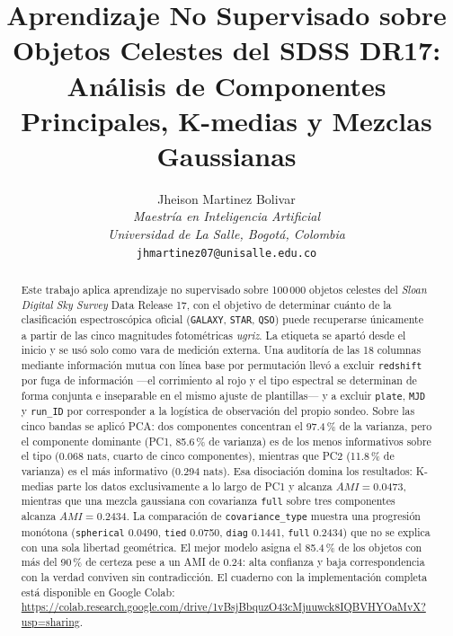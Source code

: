 \documentclass[10pt,journal]{IEEEtran}
\newcommand{\enlacenb}{https://colab.research.google.com/drive/1vBsjBbquzO43cMjuuwck8IQBVHYOaMvX?usp=sharing}
\begin{document}
  \title{Aprendizaje No Supervisado sobre Objetos Celestes del {SDSS} {DR17}:\\
    An\'alisis de Componentes Principales, K-medias y Mezclas Gaussianas}

  \author{
    Jheison Martinez Bolivar\\
    \textit{Maestr\'ia en Inteligencia Artificial}\\
    \textit{Universidad de La Salle, Bogot\'a, Colombia}\\
    \texttt{jhmartinez07@unisalle.edu.co}
  }
  \maketitle

  \begin{abstract}
    Este trabajo aplica aprendizaje no supervisado sobre 100\,000 objetos celestes del \emph{Sloan Digital Sky Survey} Data Release 17, con el objetivo de determinar cu\'anto de la clasificaci\'on espectrosc\'opica oficial (\texttt{GALAXY}, \texttt{STAR}, \texttt{QSO}) puede recuperarse \'unicamente a partir de las cinco magnitudes fotom\'etricas \emph{ugriz}. La etiqueta se apart\'o desde el inicio y se us\'o solo como vara de medici\'on externa. Una auditor\'ia de las 18 columnas mediante informaci\'on mutua con l\'inea base por permutaci\'on llev\'o a excluir \texttt{redshift} por fuga de informaci\'on ---el corrimiento al rojo y el tipo espectral se determinan de forma conjunta e inseparable en el mismo ajuste de plantillas--- y a excluir \texttt{plate}, \texttt{MJD} y \texttt{run\_ID} por corresponder a la log\'istica de observaci\'on del propio sondeo. Sobre las cinco bandas se aplic\'o PCA: dos componentes concentran el 97.4\,\% de la varianza, pero el componente dominante (PC1, 85.6\,\% de varianza) es de los menos informativos sobre el tipo (0.068 nats, cuarto de cinco componentes), mientras que PC2 (11.8\,\% de varianza) es el m\'as informativo (0.294 nats). Esa disociaci\'on domina los resultados: K-medias parte los datos exclusivamente a lo largo de PC1 y alcanza $AMI=0.0473$, mientras que una mezcla gaussiana con covarianza \texttt{full} sobre tres componentes alcanza $AMI=0.2434$. La comparaci\'on de \texttt{covariance\_type} muestra una progresi\'on mon\'otona (\texttt{spherical} 0.0490, \texttt{tied} 0.0750, \texttt{diag} 0.1441, \texttt{full} 0.2434) que no se explica con una sola libertad geom\'etrica. El mejor modelo asigna el 85.4\,\% de los objetos con m\'as del 90\,\% de certeza pese a un AMI de 0.24: alta confianza y baja correspondencia con la verdad conviven sin contradicci\'on. El cuaderno con la implementaci\'on completa est\'a disponible en Google Colab: \url{\enlacenb}.
  \end{abstract}
\end{document}
